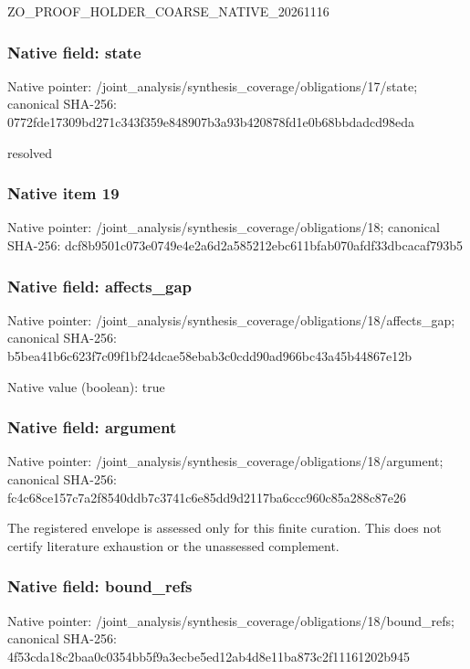 \documentclass[10pt,a4paper]{article}
\begin{document}
\begingroup\raggedright\sloppy ZO\_\allowbreak{}PROOF\_\allowbreak{}HOLDER\_\allowbreak{}COARSE\_\allowbreak{}NATIVE\_\allowbreak{}20261116\par\endgroup

\subsubsection{Native field: state}
Native pointer: /joint\_\allowbreak{}analysis/synthesis\_\allowbreak{}coverage/obligations/17/state; canonical SHA-256: 0772fde17309bd271c343f359e848907b3a93b420878fd1e0b68bbdadcd98eda

\begingroup\raggedright\sloppy resolved\par\endgroup

\subsubsection{Native item 19}
Native pointer: /joint\_\allowbreak{}analysis/synthesis\_\allowbreak{}coverage/obligations/18; canonical SHA-256: dcf8b9501c073e0749e4e2a6d2a585212ebc611bfab070afdf33dbcacaf793b5

\subsubsection{Native field: affects\_\allowbreak{}gap}
Native pointer: /joint\_\allowbreak{}analysis/synthesis\_\allowbreak{}coverage/obligations/18/affects\_\allowbreak{}gap; canonical SHA-256: b5bea41b6c623f7c09f1bf24dcae58ebab3c0cdd90ad966bc43a45b44867e12b

Native value (boolean): true

\subsubsection{Native field: argument}
Native pointer: /joint\_\allowbreak{}analysis/synthesis\_\allowbreak{}coverage/obligations/18/argument; canonical SHA-256: fc4c68ce157c7a2f8540ddb7c3741c6e85dd9d2117ba6ccc960c85a288c87e26

\begingroup\raggedright\sloppy The registered envelope is assessed only for this finite curation. This does not certify literature exhaustion or the unassessed complement.\par\endgroup

\subsubsection{Native field: bound\_\allowbreak{}refs}
Native pointer: /joint\_\allowbreak{}analysis/synthesis\_\allowbreak{}coverage/obligations/18/bound\_\allowbreak{}refs; canonical SHA-256: 4f53cda18c2baa0c0354bb5f9a3ecbe5ed12ab4d8e11ba873c2f11161202b945
\end{document}
